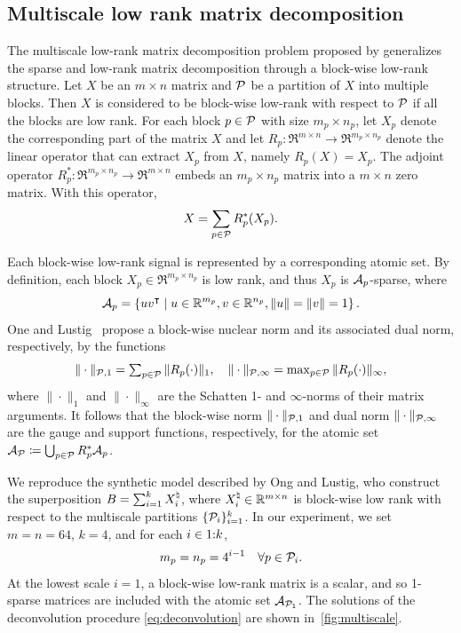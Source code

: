 \subsection{Multiscale low rank matrix decomposition} \label{sec:3-5-4}

The multiscale low-rank matrix decomposition problem proposed by \citet{ong2016beyond} generalizes the sparse and low-rank matrix decomposition through a block-wise low-rank structure. Let $X$ be an $m \times n$ matrix and $\mathcal{P}$ be a partition of $X$ into multiple blocks. Then $X$ is considered to be block-wise low-rank with respect to $\mathcal{P}$ if all the blocks are low rank. For each block $p\in\mathcal{P}$ with size $m_p \times n_p$, let $X_p$ denote the corresponding part of the matrix $X$ and let $R_p: \Re^{m \times n} \to \Re^{m_p \times n_p}$ denote the linear operator that can extract $X_p$ from $X$, namely $R_p(X) = X_p$. The adjoint operator $R_p^*: \Re^{m_p \times n_p} \to \Re^{m \times n}$ embeds an $m_p \times n_p$ matrix into a $m \times n$ zero matrix. With this operator, 
\begin{equation*}
  X = \sum\limits_{p \in \mathcal{P}} R_p^*(X_p).
\end{equation*}

Each block-wise low-rank signal is represented by a corresponding atomic set. By definition, each block $X_p \in \Re^{m_p \times n_p}$ is low rank, and thus $X_p$ is $\mathcal{A}_p$-sparse, where 
\[
  \mathcal{A}_p = \left\{uv^\intercal \mid u \in \mathbb{R}^{m_p}, v \in \mathbb{R}^{n_p}, \|u\| = \|v\| = 1\right\}.
\]
One and Lustig~\cite{ong2016beyond} propose a block-wise nuclear norm and its associated dual norm, respectively, by the functions 
\[
  \|\cdot\|_{\mathcal{P},1} = \textstyle \sum_{p \in \mathcal{P}} \|R_p(\cdot)\|_1,
  \quad
  \|\cdot\|_{\mathcal{P},\infty} = \max_{p \in \mathcal{P}} \|R_p(\cdot)\|_{\infty},
\]
where $\|\cdot\|_1$ and $\|\cdot\|_\infty$ are the Schatten 1- and $\infty$-norms of their matrix arguments. It follows that the block-wise norm $\|\cdot\|_{\mathcal{P},1}$ and dual norm $\|\cdot\|_{\mathcal{P},\infty}$ are the gauge and support functions, respectively, for the atomic set $\mathcal{A}_{\mathcal{P}} \coloneqq  \bigcup_{p \in \mathcal{P}} R_p^*\mathcal{A}_p$.

We reproduce the synthetic model described by Ong and Lustig, who construct the superposition $B = \sum_{i = 1}^k X_i^{\natural}$,
where $X_i^{\natural} \in \mathbb{R}^{m \times n}$ is block-wise low rank with respect to the multiscale partitions $\{\mathcal{P}_i\}_{i = 1}^k$. In our experiment, we set $m = n = 64$, $k = 4$, and for each $i\in1\mathord{:}k$,
\[m_p = n_p = 4^{i-1}  \quad \forall p \in \mathcal{P}_i.\]
At the lowest scale $i=1$, a block-wise low-rank matrix is a scalar, and so 1-sparse matrices are included with the atomic set $\mathcal{A}_{\mathcal{P}_1}$.  The solutions of the deconvolution procedure \autoref{eq:deconvolution} are shown in~\autoref{fig:multiscale}.

